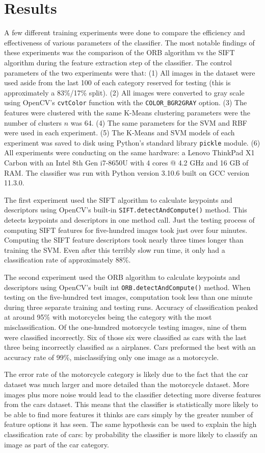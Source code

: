 \documentclass[stu,hidelinks,floatsintext,donotrepeattitle]{apa7}
\begin{document}
\section{Results}
A few different training experiments were done to compare the efficiency and effectiveness of various parameters of the classifier. The most notable findings of these experiments was the comparison of the ORB algorithm vs the SIFT algorithm during the feature extraction step of the classifier. The control parameters of the two experiments were that: (1) All images in the dataset were used aside from the last 100 of each category reserved for testing (this is approximately a 83\%/17\% split). (2) All images were converted to gray scale using OpenCV's \verb|cvtColor| function with the \verb|COLOR_BGR2GRAY| option. (3) The features were clustered with the same K-Means clustering parameters were the number of clusters $n$ was 64. (4) The same parameters for the SVM and RBF were used in each experiment. (5) The K-Means and SVM models of each experiment was saved to disk using Python's standard library \verb|pickle| module. (6) All experiments were conducting on the same hardware: a Lenovo ThinkPad X1 Carbon with an Intel 8th Gen i7-8650U with 4 cores @ 4.2 GHz and 16 GB of RAM. The classifier was run with Python version 3.10.6 built on GCC version 11.3.0.\par
The first experiment used the SIFT algorithm to calculate keypoints and descriptors using OpenCV's built-in \verb|SIFT.detectAndCompute()| method. This detects keypoints and descriptors in one method call. Just the testing process of computing SIFT features for five-hundred images took just over four minutes. Computing the SIFT feature descriptors took nearly three times longer than training the SVM. Even after this terribly slow run time, it only had a classification rate of approximately 88\%.\par
The second experiment used the ORB algorithm to calculate keypoints and descriptors using OpenCV's built int \verb|ORB.detectAndCompute()| method. When testing on the five-hundred test images, computation took less than one minute during three separate training and testing runs. Accuracy of classification peaked at around 95\% with motorcycles being the category with the most misclassification. Of the one-hundred motorcycle testing images, nine of them were classified incorrectly. Six of those six were classified as cars with the last three being incorrectly classified as a airplanes. Cars preformed the best with an accuracy rate of 99\%, misclassifying only one image as a motorcycle.\par
The error rate of the motorcycle category is likely due to the fact that the car dataset was much larger and more detailed than the motorcycle dataset. More images plus more noise would lead to the classifier detecting more diverse features from the cars dataset. This means that the classifier is statistically more likely to be able to find more features it thinks are cars simply by the greater number of feature options it has seen. The same hypothesis can be used to explain the high classification rate of cars: by probability the classifier is more likely to classify an image as part of the car category.
\end{document}

